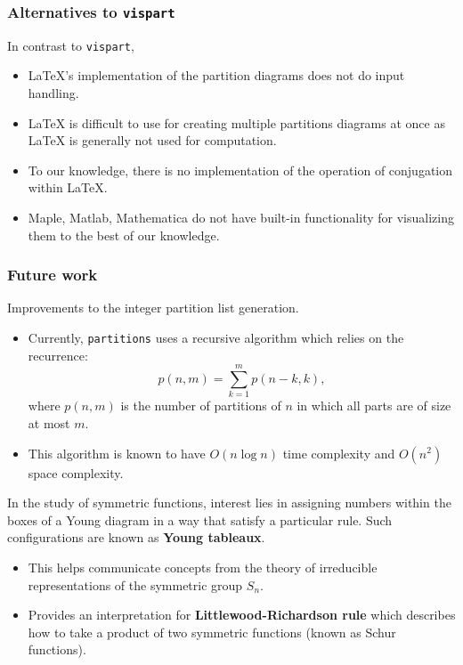 \documentclass{beamer}
\begin{document}
\begin{frame}
\frametitle{Alternatives to \texttt{vispart}}

In contrast to \texttt{vispart},
\begin{itemize}
	\item LaTeX's implementation of the partition diagrams does not do input handling.
	\item LaTeX is difficult to use for creating multiple partitions diagrams at once as LaTeX is generally not used for computation.
	\item To our knowledge, there is no implementation of the operation of conjugation within LaTeX.
	\item Maple, Matlab, Mathematica do not have built-in functionality for visualizing them to the best of our knowledge.
\end{itemize}
\end{frame}


\begin{frame}
\frametitle{Future work}	

Improvements to the integer partition list generation.
\begin{itemize}
	\item Currently, \texttt{partitions} uses a recursive algorithm which relies on the recurrence:
	$$p(n,m) = \sum_{k=1}^{m}p(n-k, k),$$
	where $p(n,m)$ is the number of partitions of $n$ in which all parts are of size at most $m$.
	\item This algorithm is known to have $O(n\log n)$ time complexity and $O(n^2)$ space complexity.
\end{itemize}
\end{frame}

\begin{frame}
	In the study of symmetric functions, interest lies in assigning numbers within the boxes of a Young diagram in a way that satisfy a particular rule. Such configurations are known as \textbf{Young tableaux}.
\begin{itemize}
\frametitle{Future work - math}
\item This helps communicate concepts from the theory of irreducible representations of the symmetric group $S_n$.
\item Provides an interpretation for \textbf{Littlewood-Richardson rule} which describes how to take a product of two symmetric functions (known as Schur functions).
\end{itemize}
\end{frame}
\end{document}
